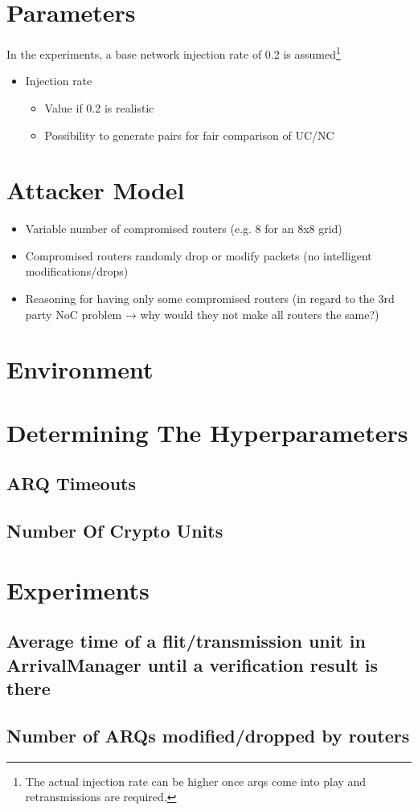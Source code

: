 \section{Parameters}
In the experiments, a base network injection rate of 0.2 is assumed\footnote{The actual injection rate can be higher once \glspl{arq} come into play
and retransmissions are required.}
\begin{itemize}
    \item Injection rate
        \begin{itemize}
            \item Value if 0.2 is realistic
            \item Possibility to generate pairs for fair comparison of UC/NC
        \end{itemize}
\end{itemize}

\section{Attacker Model}
\begin{itemize}
    \item Variable number of compromised routers (e.g. 8 for an 8x8 grid)
    \item Compromised routers randomly drop or modify packets (no intelligent modifications/drops)
    \item Reasoning for having only some compromised routers (in regard to the 3rd party NoC problem → why would they not make all routers the same?)
\end{itemize}

\section{Environment}

\section{Determining The Hyperparameters}
\subsection{ARQ Timeouts}
\subsection{Number Of Crypto Units}

\section{Experiments}
\subsection{Average time of a flit/transmission unit in ArrivalManager until a verification result is there}
\subsection{Number of ARQs modified/dropped by routers}

